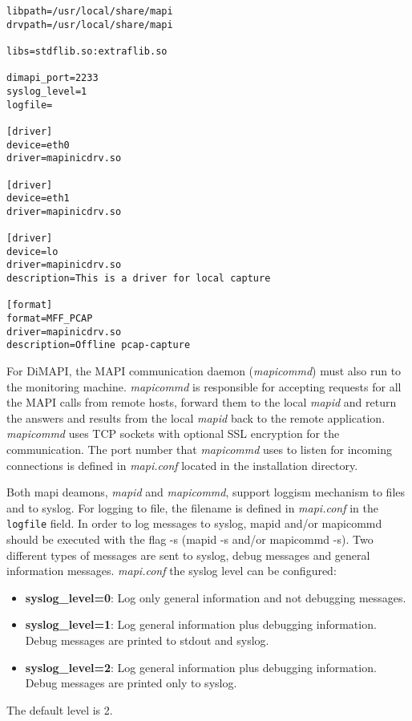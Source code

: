 \documentclass[a4paper, 11pt]{article}
\begin{document}
\begin{scriptsize}
\begin{verbatim}
libpath=/usr/local/share/mapi
drvpath=/usr/local/share/mapi

libs=stdflib.so:extraflib.so

dimapi_port=2233
syslog_level=1
logfile=

[driver]
device=eth0
driver=mapinicdrv.so

[driver]
device=eth1
driver=mapinicdrv.so

[driver]
device=lo
driver=mapinicdrv.so
description=This is a driver for local capture

[format]
format=MFF_PCAP
driver=mapinicdrv.so
description=Offline pcap-capture

\end{verbatim}
\end{scriptsize}

For DiMAPI, the MAPI communication daemon (\textit{mapicommd}) must also run to the 
monitoring machine.
\textit{mapicommd} is responsible for accepting requests for all the MAPI calls from remote hosts,
forward them to the local \textit{mapid} and return the answers and results from the local
\textit{mapid} back to the remote application.
\textit{mapicommd} uses TCP sockets with optional SSL encryption for the communication.
The port number that \textit{mapicommd} uses to listen for incoming connections is defined in
\textit{mapi.conf} located in the installation directory.

Both mapi deamons, \textit{mapid} and \textit{mapicommd}, support loggism mechanism to files
and to syslog.
For logging to file, the filename is defined in \textit{mapi.conf} in the \texttt{logfile} field.
In order to log messages to syslog, mapid and/or mapicommd should be executed
with the flag -s (mapid -s and/or mapicommd -s). 
Two different types of messages are sent to syslog, debug messages and
general information messages. \textit{mapi.conf} the syslog
level can be configured:
\begin{itemize}
\item \textbf{syslog\_level=0}: Log only general information and not debugging messages.
\item \textbf{syslog\_level=1}: Log general information plus debugging information. Debug messages are printed to stdout and syslog.
\item \textbf{syslog\_level=2}: Log general information plus debugging information. Debug messages are printed only to syslog.
\end{itemize}
The default level is 2.
\end{document}
